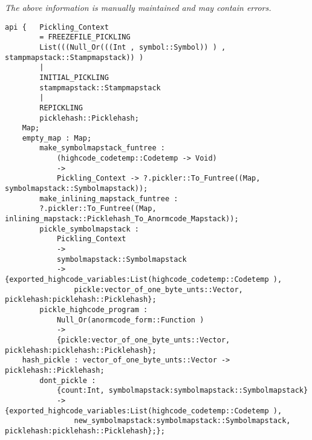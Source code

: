 \label{api:Pickler\_Junk}

{\tiny \it The above information is manually maintained and may contain errors.}
\begin{verbatim}
api {   Pickling_Context
        = FREEZEFILE_PICKLING
        List(((Null_Or(((Int , symbol::Symbol)) ) , stampmapstack::Stampmapstack)) )
        |
        INITIAL_PICKLING
        stampmapstack::Stampmapstack
        |
        REPICKLING
        picklehash::Picklehash;
    Map;
    empty_map : Map;
        make_symbolmapstack_funtree :
            (highcode_codetemp::Codetemp -> Void)
            ->
            Pickling_Context -> ?.pickler::To_Funtree((Map, symbolmapstack::Symbolmapstack));
        make_inlining_mapstack_funtree :
        ?.pickler::To_Funtree((Map, inlining_mapstack::Picklehash_To_Anormcode_Mapstack));
        pickle_symbolmapstack :
            Pickling_Context
            ->
            symbolmapstack::Symbolmapstack
            ->  {exported_highcode_variables:List(highcode_codetemp::Codetemp ),
                pickle:vector_of_one_byte_unts::Vector, picklehash:picklehash::Picklehash};
        pickle_highcode_program :
            Null_Or(anormcode_form::Function )
            ->
            {pickle:vector_of_one_byte_unts::Vector, picklehash:picklehash::Picklehash};
    hash_pickle : vector_of_one_byte_unts::Vector -> picklehash::Picklehash;
        dont_pickle :
            {count:Int, symbolmapstack:symbolmapstack::Symbolmapstack}
            ->  {exported_highcode_variables:List(highcode_codetemp::Codetemp ),
                new_symbolmapstack:symbolmapstack::Symbolmapstack, picklehash:picklehash::Picklehash};};
\end{verbatim}
